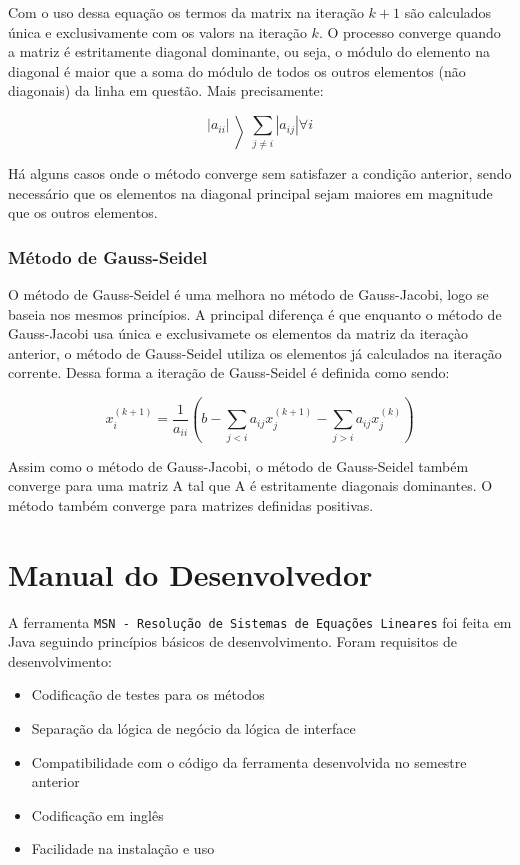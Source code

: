 \documentclass[a4paper,10pt]{report}
\newcommand{\ferramenta}{\texttt{MSN - Resolução de Sistemas de Equações Lineares}\xspace}
\begin{document}
Com o uso dessa equação os termos da matrix na iteração $k+1$ são calculados única e exclusivamente com os valors na iteração $k$. O processo converge quando a matriz é estritamente diagonal dominante, ou seja, o módulo do elemento na diagonal é maior que a soma do módulo de todos os outros elementos (não diagonais) da linha em questão. Mais precisamente:

\begin{equation*}
|a_{ii}| \left\rangle \sum_{j \neq i}|a_{ij}| \forall i
\end{equation*}

Há alguns casos onde o método converge sem satisfazer a condição anterior, sendo necessário que os elementos na diagonal principal sejam maiores em magnitude que os outros elementos.

\subsection{Método de Gauss-Seidel}

O método de Gauss-Seidel é uma melhora no método de Gauss-Jacobi, logo se baseia nos mesmos princípios. A principal diferença é que enquanto o método de Gauss-Jacobi usa única e exclusivamete os elementos da matriz da iteraçào anterior, o método de Gauss-Seidel utiliza os elementos já calculados na iteração corrente. Dessa forma a iteração de Gauss-Seidel é definida como sendo:

\begin{equation*}
 x^{(k+1)}_{i}=\dfrac{1}{a_{ii}}(b-\sum_{j < i} a_{ij}x^{(k+1)}_{j}-\sum_{j > i} a_{ij}x^{(k)}_{j})
\end{equation*}

Assim como o método de Gauss-Jacobi, o método de Gauss-Seidel também converge para uma matriz A tal que A é estritamente diagonais dominantes. O método também converge para matrizes definidas positivas.

\chapter{Manual do Desenvolvedor}
\label{desenvolvedor}

A ferramenta \ferramenta foi feita em Java seguindo princípios básicos de desenvolvimento. Foram requisitos de desenvolvimento:

\begin{itemize}
 \item Codificação de testes para os métodos
 \item Separação da lógica de negócio da lógica de interface
 \item Compatibilidade com o código da ferramenta desenvolvida no semestre anterior\cite{msnlab}
 \item Codificação em inglês
 \item Facilidade na instalação e uso
\end{itemize}
\end{document}

